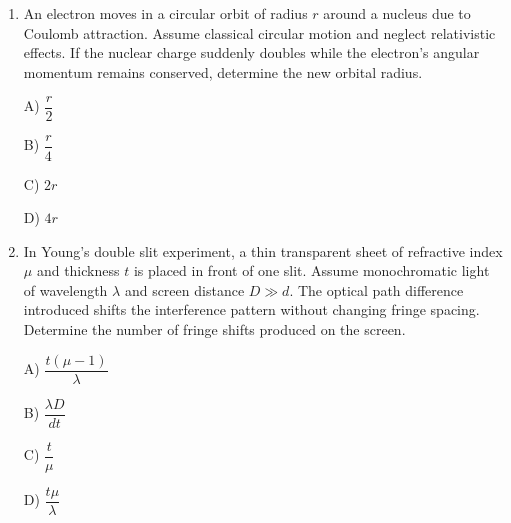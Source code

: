 \documentclass[12pt]{article}
\begin{document}
\begin{enumerate}
D) unchanged

\item

An electron moves in a circular orbit of radius $r$ around a nucleus due to Coulomb attraction. 
Assume classical circular motion and neglect relativistic effects. 
If the nuclear charge suddenly doubles while the electron’s angular momentum remains conserved, determine the new orbital radius.

A) $\dfrac{r}{2}$

B) $\dfrac{r}{4}$

C) $2r$

D) $4r$

\item

In Young’s double slit experiment, a thin transparent sheet of refractive index $\mu$ and thickness $t$ is placed in front of one slit. 
Assume monochromatic light of wavelength $\lambda$ and screen distance $D \gg d$. 
The optical path difference introduced shifts the interference pattern without changing fringe spacing. 
Determine the number of fringe shifts produced on the screen.

A) $\dfrac{t(\mu-1)}{\lambda}$

B) $\dfrac{\lambda D}{dt}$

C) $\dfrac{t}{\mu}$

D) $\dfrac{t\mu}{\lambda}$


\end{enumerate}
\end{document}

